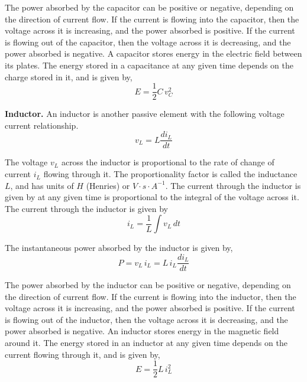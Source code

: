 The power absorbed by the capacitor can be positive or negative, depending on the direction of current flow. If the current is flowing into the capacitor, then the voltage across it is increasing, and the power absorbed is positive. If the current is flowing out of the capacitor, then the voltage across it is decreasing, and the power absorbed is negative. A capacitor stores energy in the electric field between its plates. The energy stored in a capacitance at any given time depends on the charge stored in it, and is given by,
\begin{equation}
    E = \frac{1}{2}  C \, v_C^2
    \label{eq:ch02-06}
\end{equation}

\noindent \textbf{Inductor.} An inductor is another passive element with the following voltage current relationship.
\begin{equation}
    v_L = L \frac{di_L}{dt}
    \label{eq:ch02-07}
\end{equation}

The voltage $v_L$ across the inductor is proportional to the rate of change of current $i_L$ flowing through it. The proportionality factor is called the inductance $L$, and has units of $H$ (Henries) or $V \cdot s \cdot A^{-1}$. The current through the inductor is given by at any given time is proportional to the integral of the voltage across it. The current through the inductor is given by
\begin{equation}
    i_L = \frac{1}{L} \int v_L \, dt
    \label{eq:ch02-08}
\end{equation}

The instantaneous power absorbed by the inductor is given by,
\begin{equation}
    P = v_L \, i_L = L \, i_L \frac{di_L}{dt}
    \label{eq:ch02-09}
\end{equation}

The power absorbed by the inductor can be positive or negative, depending on the direction of current flow. If the current is flowing into the inductor, then the voltage across it is increasing, and the power absorbed is positive. If the current is flowing out of the inductor, then the voltage across it is decreasing, and the power absorbed is negative. An inductor stores energy in the magnetic field around it. The energy stored in an inductor at any given time depends on the current flowing through it, and is given by,
\begin{equation}
    E = \frac{1}{2}  L \, i_L^2
    \label{eq:ch02-10}
\end{equation}

